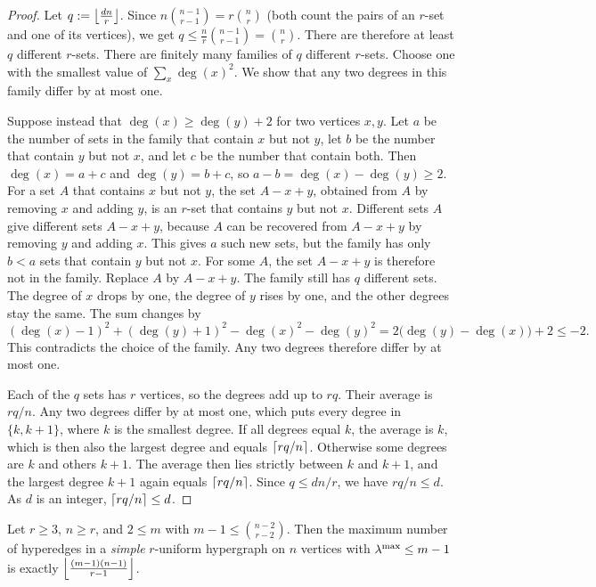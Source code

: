 \begin{proof}
Let $q := \left\lfloor \frac{dn}{r} \right\rfloor$.
Since $n\binom{n-1}{r-1} = r\binom{n}{r}$ (both count the pairs of an $r$-set and one of its vertices), we get $q \le \frac{n}{r}\binom{n-1}{r-1} = \binom{n}{r}$.
There are therefore at least $q$ different $r$-sets.
There are finitely many families of $q$ different $r$-sets. Choose one with the smallest value of $\sum_x \deg(x)^2$.
We show that any two degrees in this family differ by at most one.

Suppose instead that $\deg(x) \ge \deg(y) + 2$ for two vertices $x,y$.
Let $a$ be the number of sets in the family that contain $x$ but not $y$, let $b$ be the number that contain $y$ but not $x$, and let $c$ be the number that contain both.
Then $\deg(x) = a+c$ and $\deg(y) = b+c$, so $a - b = \deg(x) - \deg(y) \ge 2$.
For a set $A$ that contains $x$ but not $y$, the set $A - x + y$, obtained from $A$ by removing $x$ and adding $y$, is an $r$-set that contains $y$ but not $x$.
Different sets $A$ give different sets $A - x + y$, because $A$ can be recovered from $A-x+y$ by removing $y$ and adding $x$.
This gives $a$ such new sets, but the family has only $b < a$ sets that contain $y$ but not $x$.
For some $A$, the set $A - x + y$ is therefore not in the family.
Replace $A$ by $A - x + y$. The family still has $q$ different sets. The degree of $x$ drops by one, the degree of $y$ rises by one, and the other degrees stay the same. The sum changes by
\[
(\deg(x)-1)^2 + (\deg(y)+1)^2 - \deg(x)^2 - \deg(y)^2
 = 2\bigl(\deg(y) - \deg(x)\bigr) + 2 \le -2.
\]
This contradicts the choice of the family.
Any two degrees therefore differ by at most one.

Each of the $q$ sets has $r$ vertices, so the degrees add up to $rq$.
Their average is $rq/n$. Any two degrees differ by at most one, which puts every degree in $\{k,k+1\}$, where $k$ is the smallest degree. If all degrees equal $k$, the average is $k$, which is then also the largest degree and equals $\left\lceil rq/n \right\rceil$. Otherwise some degrees are $k$ and others $k+1$. The average then lies strictly between $k$ and $k+1$, and the largest degree $k+1$ again equals $\left\lceil rq/n \right\rceil$.
Since $q \le dn/r$, we have $rq/n \le d$. As $d$ is an integer, $\left\lceil rq/n \right\rceil \le d$.
\end{proof}

\begin{theorem}\label{thm:simple-hyper-edge}
Let $r \ge 3$, $n \ge r$, and $2 \le m$ with $m-1 \le \binom{n-2}{r-2}$. Then the maximum number of hyperedges in a \emph{simple} $r$-uniform hypergraph on $n$ vertices with $\lambda^{\max}\le m-1$ is exactly $\left\lfloor \frac{(m-1)(n-1)}{r-1} \right\rfloor$.
\end{theorem}

